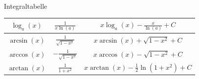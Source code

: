 \begin{lemma}{Integraltabelle}
{\begin{tabular}{|c|c|c|}
	    \hline
	    \(\log_a(x)\)                             & \(\frac{1}{x\ln(a)}\)                     & \(x\log_a(x)-\frac{x}{\ln(a)}+C\)       \\
	    \hline
	    \(\arcsin(x)\)                            & \(\frac{1}{\sqrt{1-x^2}}\)                & \(x\arcsin(x)+\sqrt{1-x^2}+C\)          \\
	    \hline
	    \(\arccos(x)\)                            & \(-\frac{1}{\sqrt{1-x^2}}\)               & \(x\arccos(x)-\sqrt{1-x^2}+C\)          \\
	    \hline
	    \(\arctan(x)\)                            & \(\frac{1}{1+x^2}\)                       & \(x\arctan(x)-\frac{1}{2}\ln(1+x^2)+C\) \\
	    \hline
	\end{tabular}
    }
\end{lemma}
